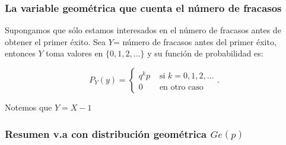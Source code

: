     \subsubsection{La variable geométrica que cuenta el número de fracasos}

    Supongamos que sólo estamos interesados en el número de fracasos antes de obtener el
    primer éxito. Sea $Y$= número de fracasos antes del primer éxito, entonces $Y$ toma
    valores en $\{0,1,2,\ldots\}$ y su función de probabilidad es:

    $$P_Y(y)=\left\{\begin{array}{ll}
 q^k p & \mbox{ si } k=0,1,2,\ldots\\
 0 &\mbox{ en otro caso}
    \end{array}\right..$$

Notemos que $Y=X-1$

        \subsubsection{Resumen v.a con distribución geométrica $Ge(p)$}

